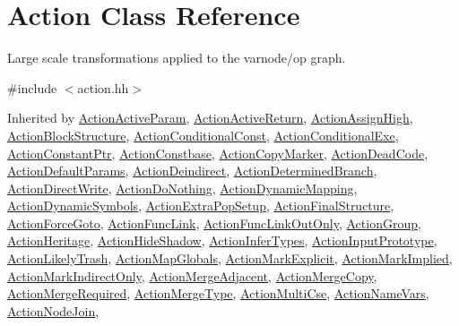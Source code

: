 \hypertarget{class_action}{}\section{Action Class Reference}
\label{class_action}


Large scale transformations applied to the varnode/op graph.  




{\ttfamily \#include $<$action.\+hh$>$}



Inherited by \mbox{\hyperlink{class_action_active_param}{Action\+Active\+Param}}, \mbox{\hyperlink{class_action_active_return}{Action\+Active\+Return}}, \mbox{\hyperlink{class_action_assign_high}{Action\+Assign\+High}}, \mbox{\hyperlink{class_action_block_structure}{Action\+Block\+Structure}}, \mbox{\hyperlink{class_action_conditional_const}{Action\+Conditional\+Const}}, \mbox{\hyperlink{class_action_conditional_exe}{Action\+Conditional\+Exe}}, \mbox{\hyperlink{class_action_constant_ptr}{Action\+Constant\+Ptr}}, \mbox{\hyperlink{class_action_constbase}{Action\+Constbase}}, \mbox{\hyperlink{class_action_copy_marker}{Action\+Copy\+Marker}}, \mbox{\hyperlink{class_action_dead_code}{Action\+Dead\+Code}}, \mbox{\hyperlink{class_action_default_params}{Action\+Default\+Params}}, \mbox{\hyperlink{class_action_deindirect}{Action\+Deindirect}}, \mbox{\hyperlink{class_action_determined_branch}{Action\+Determined\+Branch}}, \mbox{\hyperlink{class_action_direct_write}{Action\+Direct\+Write}}, \mbox{\hyperlink{class_action_do_nothing}{Action\+Do\+Nothing}}, \mbox{\hyperlink{class_action_dynamic_mapping}{Action\+Dynamic\+Mapping}}, \mbox{\hyperlink{class_action_dynamic_symbols}{Action\+Dynamic\+Symbols}}, \mbox{\hyperlink{class_action_extra_pop_setup}{Action\+Extra\+Pop\+Setup}}, \mbox{\hyperlink{class_action_final_structure}{Action\+Final\+Structure}}, \mbox{\hyperlink{class_action_force_goto}{Action\+Force\+Goto}}, \mbox{\hyperlink{class_action_func_link}{Action\+Func\+Link}}, \mbox{\hyperlink{class_action_func_link_out_only}{Action\+Func\+Link\+Out\+Only}}, \mbox{\hyperlink{class_action_group}{Action\+Group}}, \mbox{\hyperlink{class_action_heritage}{Action\+Heritage}}, \mbox{\hyperlink{class_action_hide_shadow}{Action\+Hide\+Shadow}}, \mbox{\hyperlink{class_action_infer_types}{Action\+Infer\+Types}}, \mbox{\hyperlink{class_action_input_prototype}{Action\+Input\+Prototype}}, \mbox{\hyperlink{class_action_likely_trash}{Action\+Likely\+Trash}}, \mbox{\hyperlink{class_action_map_globals}{Action\+Map\+Globals}}, \mbox{\hyperlink{class_action_mark_explicit}{Action\+Mark\+Explicit}}, \mbox{\hyperlink{class_action_mark_implied}{Action\+Mark\+Implied}}, \mbox{\hyperlink{class_action_mark_indirect_only}{Action\+Mark\+Indirect\+Only}}, \mbox{\hyperlink{class_action_merge_adjacent}{Action\+Merge\+Adjacent}}, \mbox{\hyperlink{class_action_merge_copy}{Action\+Merge\+Copy}}, \mbox{\hyperlink{class_action_merge_required}{Action\+Merge\+Required}}, \mbox{\hyperlink{class_action_merge_type}{Action\+Merge\+Type}}, \mbox{\hyperlink{class_action_multi_cse}{Action\+Multi\+Cse}}, \mbox{\hyperlink{class_action_name_vars}{Action\+Name\+Vars}}, \mbox{\hyperlink{class_action_node_join}{Action\+Node\+Join}}, 